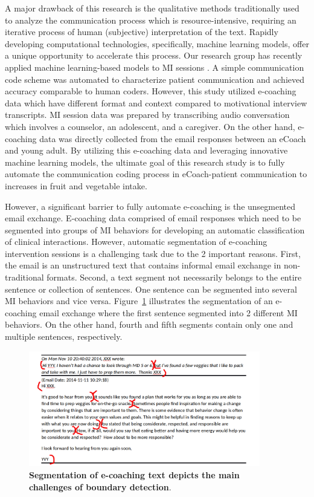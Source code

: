 \documentclass{amia}
\begin{document}
A major drawback of this research is the qualitative methods traditionally used to analyze the communication process which is resource-intensive, requiring an iterative process of human (subjective) interpretation of the text. Rapidly developing computational technologies, specifically, machine learning models, offer a unique opportunity to accelerate this process. Our research group has recently applied machine learning-based models to MI sessions \cite{hasan2016study,kotov2015interpretable}. A simple communication code scheme was automated to characterize patient communication and achieved accuracy comparable to human coders\cite{hasan2016study}. However, this study utilized e-coaching data which have different format and context compared to motivational interview transcripts. MI session data was prepared by transcribing audio conversation which involves a counselor, an adolescent, and a caregiver. On the other hand, e-coaching data was directly collected from the email responses between an eCoach and young adult. By utilizing this e-coaching data and leveraging innovative machine learning models, the ultimate goal of this research study is to fully automate the communication coding process in eCoach-patient communication to increases in fruit and vegetable intake.

However, a significant barrier to fully automate e-coaching is the unsegmented email exchange. E-coaching data comprised of email responses which need to be segmented into groups of MI behaviors for developing an automatic classification of clinical interactions. However, automatic segmentation of e-coaching intervention sessions is a challenging task due to the 2 important reasons. First, the email is an unstructured text that contains informal email exchange in non-traditional formats. Second, a text segment not necessarily belongs to the entire sentence or collection of sentences. One sentence can be segmented into several MI behaviors and vice versa. Figure~\ref{fig:text-segment} illustrates the segmentation of an e-coaching email exchange where the first sentence segmented into 2 different MI behaviors. On the other hand, fourth and fifth segments contain only one and multiple sentences, respectively.  

\begin{figure}[!htb]
    \centering
    \includegraphics[width=0.9\textwidth]{figures/segment-example.png}
    \caption{\textbf{Segmentation of e-coaching text depicts the main challenges of boundary detection}.}
    \label{fig:text-segment}
\end{figure}
\end{document}
